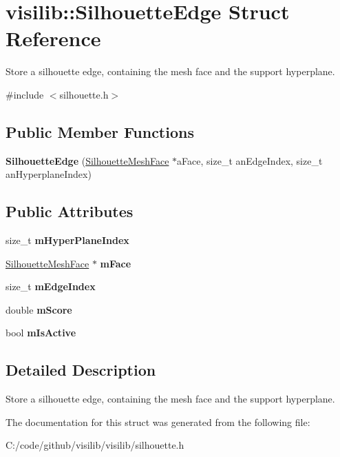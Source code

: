 \hypertarget{structvisilib_1_1_silhouette_edge}{}\section{visilib\+::Silhouette\+Edge Struct Reference}
\label{structvisilib_1_1_silhouette_edge}


Store a silhouette edge, containing the mesh face and the support hyperplane. 




{\ttfamily \#include $<$silhouette.\+h$>$}

\subsection*{Public Member Functions}
\begin{DoxyCompactItemize}
\item 
\mbox{\label{structvisilib_1_1_silhouette_edge_a894736143f0b9d6b0320922216192a46}} 
{\bfseries Silhouette\+Edge} (\mbox{\hyperlink{classvisilib_1_1_silhouette_mesh_face}{Silhouette\+Mesh\+Face}} $\ast$a\+Face, size\+\_\+t an\+Edge\+Index, size\+\_\+t an\+Hyperplane\+Index)
\end{DoxyCompactItemize}
\subsection*{Public Attributes}
\begin{DoxyCompactItemize}
\item 
\mbox{\label{structvisilib_1_1_silhouette_edge_aec1b2891776743cef966392f1959caed}} 
size\+\_\+t {\bfseries m\+Hyper\+Plane\+Index}
\item 
\mbox{\label{structvisilib_1_1_silhouette_edge_abcaefffdb0a72f109060c0053f30c9e1}} 
\mbox{\hyperlink{classvisilib_1_1_silhouette_mesh_face}{Silhouette\+Mesh\+Face}} $\ast$ {\bfseries m\+Face}
\item 
\mbox{\label{structvisilib_1_1_silhouette_edge_add5ccfee703556c1d453d40bcf2fc969}} 
size\+\_\+t {\bfseries m\+Edge\+Index}
\item 
\mbox{\label{structvisilib_1_1_silhouette_edge_af4db80b5161c888d044ad4b7fd15435b}} 
double {\bfseries m\+Score}
\item 
\mbox{\label{structvisilib_1_1_silhouette_edge_ab5327c9ef3df2a50ac8e462b0c24b2e9}} 
bool {\bfseries m\+Is\+Active}
\end{DoxyCompactItemize}


\subsection{Detailed Description}
Store a silhouette edge, containing the mesh face and the support hyperplane. 

The documentation for this struct was generated from the following file\+:\begin{DoxyCompactItemize}
\item 
C\+:/code/github/visilib/visilib/silhouette.\+h\end{DoxyCompactItemize}
